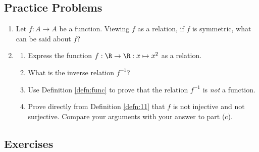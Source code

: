 \subsection*{Practice Problems}

\begin{enumerate}\renewcommand{\labelenumi}{\thesubsection.\theenumi}
\item Let $f : A \to A$ be a function. Viewing $f$ as a relation, if $f$ is symmetric, what can be said about $f$? 

\item \begin{enumerate}
    \item Express the function $f:\R\to\R:x\mapsto x^2$ as a relation.
    \item What is the inverse relation $f^{-1}$?
    \item Use Definition \ref{defn:func} to prove that the relation $f^{-1}$ is \emph{not} a function.
    \item Prove directly from Definition \ref{defn:11} that $f$ is not injective and not surjective. Compare your arguments with your answer to part (c).
  \end{enumerate}
\end{enumerate}


\subsection*{Exercises}

